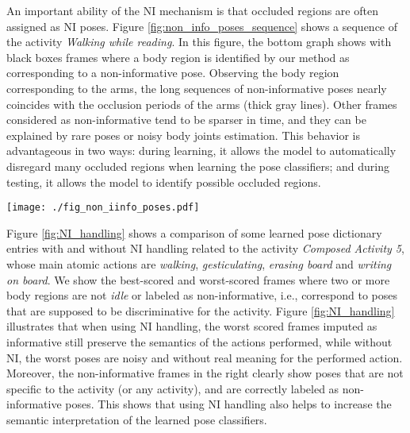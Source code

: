 An important ability of the NI mechanism is that occluded regions are often
assigned as NI poses. Figure \ref{fig:non_info_poses_sequence} shows a
sequence of the activity \emph{Walking while reading}. In this figure, the bottom graph shows with 
black boxes frames where a body region is identified by our method as corresponding to a 
non-informative pose. Observing the body region corresponding to the arms, the long sequences of 
non-informative
poses nearly coincides with the occlusion periods of the arms (thick gray lines). Other frames
considered as non-informative tend to be sparser in time, and they can be
explained by rare poses or noisy body joints estimation. This behavior is
advantageous in two ways: during learning, it allows the model to
automatically disregard many occluded regions when learning the pose
classifiers; and during testing, it allows the model to identify possible occluded regions.

\begin{figure*}[t]
\begin{center}
\texttt{[image: ./fig\_non\_iinfo\_poses.pdf]}
\end{center}
\caption{ } \label{fig:non_info_poses_sequence}
\end{figure*}

Figure \ref{fig:NI_handling} shows a comparison of some learned pose dictionary
entries with and without NI handling related to the activity \emph{Composed
Activity 5}, whose main atomic actions are \emph{walking},
\emph{gesticulating}, \emph{erasing board} and \emph{writing on board}. We show
the best-scored and worst-scored frames where two or more body regions are not
\emph{idle} or labeled as non-informative, i.e., correspond to poses that are
supposed to be discriminative for the activity.
Figure \ref{fig:NI_handling} illustrates that when using NI handling, the worst scored
frames imputed
as informative still preserve the semantics of the actions performed, while
without NI, the worst poses are noisy and without real meaning for the
performed action. Moreover, the non-informative frames in the right
clearly show poses that are not specific to the activity (or any activity),
and are correctly labeled as non-informative poses. This shows that using NI handling also helps 
to increase the semantic interpretation of the learned pose classifiers.

